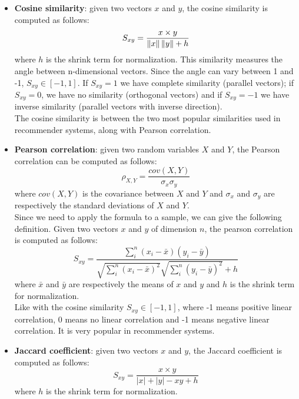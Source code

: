 \begin{itemize}
\item \textbf{Cosine similarity}: given two vectors $x$ and $y$, the cosine similarity is computed as follows:
\begin{equation*}
S_{xy} = \frac{x \times y}{\left\lVert x\right\rVert \left\lVert y\right\rVert + h}
\end{equation*}
where $h$ is the shrink term for normalization.
This similarity measures the angle between n-dimensional vectors. Since the angle can vary between 1 and -1, $S_{xy} \in [-1, 1]$. If $S_{xy} = 1$ we have complete similarity (parallel vectors); if $S_{xy} = 0$, we have no similarity (orthogonal vectors) and if $S_{xy} = -1$ we have inverse similarity (parallel vectors with inverse direction).\\
The cosine similarity is between the two most popular similarities used in recommender systems, along with Pearson correlation.
\item \textbf{Pearson correlation}: given two random variables $X$ and $Y$, the Pearson correlation can be computed as follows:
\begin{equation*}
\rho_{X,Y} = \frac{cov(X,Y)}{\sigma_x \sigma_y}
\end{equation*}
where $cov(X,Y)$ is the covariance between $X$ and $Y$ and $\sigma_x$ and $\sigma_y$ are respectively the standard deviations of $X$ and $Y$.\\
Since we need to apply the formula to a sample, we can give the following definition. Given two vectors $x$ and $y$ of dimension $n$, the pearson correlation is computed as follows:
\begin{equation*}
S_{xy} = \frac{\sum_{i}^{n} (x_i - \bar{x})(y_i - \bar{y})}{\sqrt{\sum_{i}^{n} (x_i - \bar{x})^2}\sqrt{\sum_{i}^{n} (y_i - \bar{y})^2} + h}
\end{equation*}
where $\bar{x}$ and $\bar{y}$ are respectively the means of $x$ and $y$ and $h$ is the shrink term for normalization.\\
Like with the cosine similarity $S_{xy} \in [-1, 1]$, where -1 means positive linear correlation, 0 means no linear correlation and -1 means negative linear correlation. It is very popular in recommender systems.
\item \textbf{Jaccard coefficient}: given two vectors $x$ and $y$, the Jaccard coefficient is computed as follows:
\begin{equation*}
S_{xy} = \frac{x \times y}{|x| + |y| - xy + h}
\end{equation*}
where $h$ is the shrink term for normalization.\\

\end{itemize}
